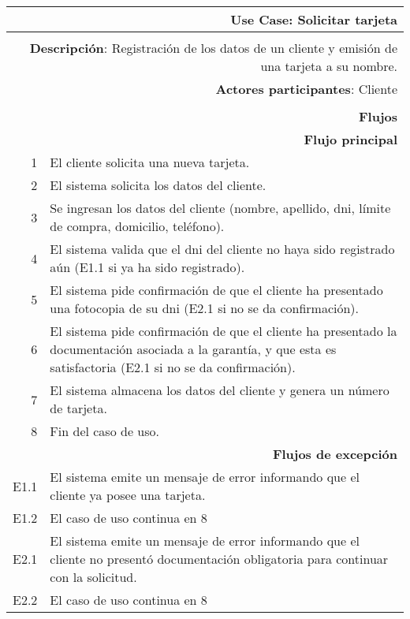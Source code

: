 \begin{tabularx}{\textwidth}{| r | X |}
\hline
\multicolumn{2}{|X|}{
\textbf{Use Case}: Solicitar tarjeta} \\

\hline
\multicolumn{2}{|c|}{\cellcolor[gray]{0.6}} \\

\hline
\multicolumn{2}{|X|}{
\textbf{Descripción}: Registración de los datos de un cliente y emisión de una
tarjeta a su nombre.} \\

\hline
\multicolumn{2}{|X|}{
\textbf{Actores participantes}: Cliente} \\

\hline
\multicolumn{2}{|c|}{\cellcolor[gray]{0.6} } \\

\hline
\multicolumn{2}{|X|}{
\textbf{Flujos}} \\

\hline
\multicolumn{2}{|X|}{
\textbf{Flujo principal}} \\

\hline
1 & El cliente solicita una nueva tarjeta. \\
\hline
2 & El sistema solicita los datos del cliente. \\
\hline
3 & Se ingresan los datos del cliente (nombre, apellido, dni, límite de compra,
domicilio, teléfono). \\
\hline
4 & El sistema valida que el dni del cliente no haya sido registrado aún (E1.1
si ya ha sido registrado). \\
\hline
5 & El sistema pide confirmación de que el cliente ha presentado una fotocopia
de su dni (E2.1 si no se da confirmación). \\
\hline
6 & El sistema pide confirmación de que el cliente ha presentado la
documentación asociada a la garantía, y que esta es satisfactoria (E2.1 si no se
da confirmación). \\
\hline
7 & El sistema almacena los datos del cliente y genera un número de tarjeta. \\
\hline
8 & Fin del caso de uso. \\

\hline
\multicolumn{2}{|X|}{
\textbf{Flujos de excepción}} \\

\hline
E1.1 & El sistema emite un mensaje de error informando que el cliente ya posee
una tarjeta. \\
\hline
E1.2 & El caso de uso continua en 8 \\

\hline
E2.1 & El sistema emite un mensaje de error informando que el cliente no
presentó documentación obligatoria para continuar con la solicitud. \\
\hline
E2.2 & El caso de uso continua en 8 \\

\hline
\end{tabularx}

